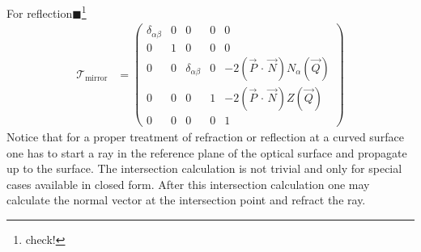 \documentclass[12pt,a4paper,twoside,openright,BCOR10mm,headsepline,titlepage,abstracton,chapterprefix,final]{scrreprt}
\newcommand{\scpm}[2]{(#1\,\cdot\,#2)}
\newcommand{\remark}[1]{{\color{red}$\blacksquare$}\footnote{{\color{red}#1}}}
\begin{document}
For reflection\remark{check!}
\begin{align}
 \mathcal{T}_{\text{mirror}} &=
 \begin{pmatrix}
  \delta_{\alpha\beta} & 0 &  0 & 0 & 0\\
   0                   & 1 & 0 & 0 & 0\\
   0                   & 0 & \delta_{\alpha\beta} & 0 & -2 \scpm{\vec{P}}{\vec{N}} N_\alpha(\vec{Q}) \\
   0                   & 0 & 0 & 1 & -2 \scpm{\vec{P}}{\vec{N}} Z(\vec{Q}) \\
   0 & 0 & 0 & 0 & 1
 \end{pmatrix}
\end{align}
Notice that for a proper treatment of refraction or reflection at a curved surface one has to start a ray in the reference plane of the 
optical surface and propagate up to the surface. The intersection calculation is not trivial and only for special cases
available in closed form. After this intersection calculation one may calculate the normal vector at the intersection point
and refract the ray.
\end{document}
